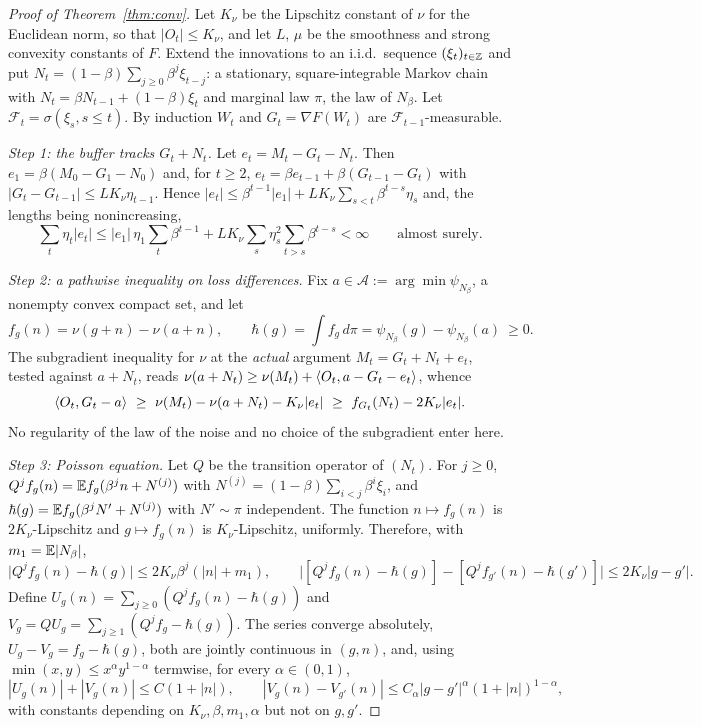 \begin{proof}[Proof of Theorem~\ref{thm:conv}]
Let $K_\nu$ be the Lipschitz constant of $\nu$ for the Euclidean norm, so that $|O_t|\le K_\nu$, and let $L$, $\mu$ be
the smoothness and strong convexity constants of $F$. Extend the innovations to an i.i.d.\ sequence $(\xi_t)_{t\in\mathbb{Z}}$
and put $N_t=(1-\beta)\sum_{j\ge0}\beta^j\xi_{t-j}$: a stationary, square-integrable Markov chain with
$N_t=\beta N_{t-1}+(1-\beta)\xi_t$ and marginal law $\pi$, the law of $N_\beta$. Let $\mathcal F_t=\sigma(\xi_s,s\le t)$.
By induction $W_t$ and $G_t=\nabla F(W_t)$ are $\mathcal F_{t-1}$-measurable.

\emph{Step 1: the buffer tracks $G_t+N_t$.} Let $e_t=M_t-G_t-N_t$. Then $e_1=\beta(M_0-G_1-N_0)$ and, for $t\ge2$,
$e_t=\beta e_{t-1}+\beta(G_{t-1}-G_t)$ with $|G_t-G_{t-1}|\le LK_\nu\eta_{t-1}$. Hence
$|e_t|\le\beta^{t-1}|e_1|+LK_\nu\sum_{s<t}\beta^{t-s}\eta_s$ and, the lengths being nonincreasing,
\begin{equation}\label{eq:esum}
\sum_t\eta_t|e_t|\le|e_1|\,\eta_1\sum_t\beta^{t-1}+LK_\nu\sum_s\eta_s^2\sum_{t>s}\beta^{t-s}<\infty\qquad\text{almost surely.}
\end{equation}

\emph{Step 2: a pathwise inequality on loss differences.} Fix $a\in\mathcal A:=\arg\min\psi_{N_\beta}$, a nonempty convex
compact set, and let
\[
f_g(n)=\nu(g+n)-\nu(a+n),\qquad\hbar(g)=\int f_g\,d\pi=\psi_{N_\beta}(g)-\psi_{N_\beta}(a)\ \ge0 .
\]
The subgradient inequality for $\nu$ at the \emph{actual} argument $M_t=G_t+N_t+e_t$, tested against $a+N_t$, reads
$\nu(a+N_t)\ge\nu(M_t)+\langle O_t, a-G_t-e_t\rangle$, whence
\begin{equation}\label{eq:path}
\inner{O_t}{G_t-a}\ \ge\ \nu(M_t)-\nu(a+N_t)-K_\nu|e_t|\ \ge\ f_{G_t}(N_t)-2K_\nu|e_t| .
\end{equation}
No regularity of the law of the noise and no choice of the subgradient enter here.

\emph{Step 3: Poisson equation.} Let $Q$ be the transition operator of $(N_t)$. For $j\ge0$,
$Q^jf_g(n)=\mathbb{E} f_g(\beta^jn+N^{(j)})$ with $N^{(j)}=(1-\beta)\sum_{i<j}\beta^i\xi_i$, and
$\hbar(g)=\mathbb{E} f_g(\beta^jN'+N^{(j)})$ with $N'\sim\pi$ independent. The function $n\mapsto f_g(n)$ is $2K_\nu$-Lipschitz
and $g\mapsto f_g(n)$ is $K_\nu$-Lipschitz, uniformly. Therefore, with $m_1=\mathbb{E}|N_\beta|$,
\[
\big|Q^jf_g(n)-\hbar(g)\big|\le2K_\nu\beta^j(|n|+m_1),\qquad
\big|[Q^jf_g(n)-\hbar(g)]-[Q^jf_{g'}(n)-\hbar(g')]\big|\le2K_\nu|g-g'| .
\]
Define $U_g(n)=\sum_{j\ge0}(Q^jf_g(n)-\hbar(g))$ and $V_g=QU_g=\sum_{j\ge1}(Q^jf_g-\hbar(g))$. The series converge
absolutely, $U_g-V_g=f_g-\hbar(g)$, both are jointly continuous in $(g,n)$, and, using
$\min(x,y)\le x^\alpha y^{1-\alpha}$ termwise, for every $\alpha\in(0,1)$,
\begin{equation}\label{eq:UV}
|U_g(n)|+|V_g(n)|\le C(1+|n|),\qquad|V_g(n)-V_{g'}(n)|\le C_\alpha|g-g'|^\alpha(1+|n|)^{1-\alpha},
\end{equation}
with constants depending on $K_\nu,\beta,m_1,\alpha$ but not on $g,g'$.


\end{proof}
